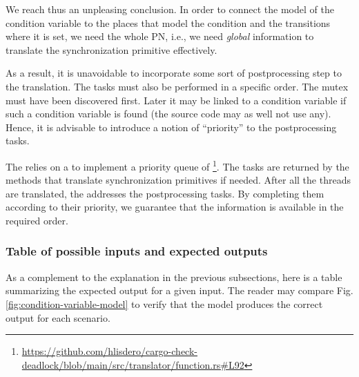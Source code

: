 We reach thus an unpleasing conclusion.
In order to connect the model of the condition variable
to the places that model the condition and the transitions where it is set,
we need the whole \acrshort{PN}, i.e., we need \emph{global} information
to translate the synchronization primitive effectively.

As a result, it is unavoidable to incorporate some sort of postprocessing step
to the translation.
The tasks must also be performed in a specific order.
The mutex must have been discovered first.
Later it may be linked to a condition variable
if such a condition variable is found (the source code may as well not use any).
Hence, it is advisable to introduce a notion of ``priority'' to the postprocessing tasks.

The  relies on a  to
implement a priority queue of
\footnote{\url{https://github.com/hlisdero/cargo-check-deadlock/blob/main/src/translator/function.rs\#L92}}.
The tasks are returned by the methods that translate synchronization primitives if needed.
After all the threads are translated, the 
addresses the postprocessing tasks.
By completing them according to their priority,
we guarantee that the information is available in the required order.

\subsubsection{Table of possible inputs and expected outputs}

As a complement to the explanation in the previous subsections,
here is a table summarizing the expected output for a given input.
The reader may compare Fig. \ref{fig:condition-variable-model} to verify that
the model produces the correct output for each scenario.

